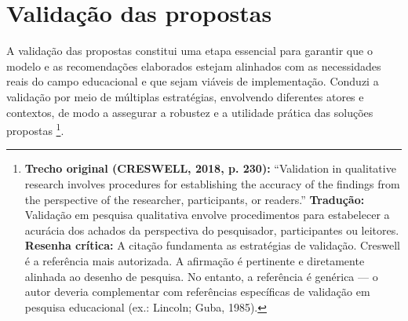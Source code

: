 \section{Validação das propostas}
\label{sec:validacao_propostas}

A validação das propostas constitui uma etapa essencial para garantir que o modelo e as recomendações elaborados estejam alinhados com as necessidades reais do campo educacional e que sejam viáveis de implementação. Conduzi a validação por meio de múltiplas estratégias, envolvendo diferentes atores e contextos, de modo a assegurar a robustez e a utilidade prática das soluções propostas \cite{CRESWELL2018}\footnote{\textbf{Trecho original (CRESWELL, 2018, p. 230):} ``Validation in qualitative research involves procedures for establishing the accuracy of the findings from the perspective of the researcher, participants, or readers.'' \textbf{Tradução:} Validação em pesquisa qualitativa envolve procedimentos para estabelecer a acurácia dos achados da perspectiva do pesquisador, participantes ou leitores. \textbf{Resenha crítica:} A citação fundamenta as estratégias de validação. Creswell é a referência mais autorizada. A afirmação é pertinente e diretamente alinhada ao desenho de pesquisa. No entanto, a referência é genérica — o autor deveria complementar com referências específicas de validação em pesquisa educacional (ex.: Lincoln; Guba, 1985).}.

